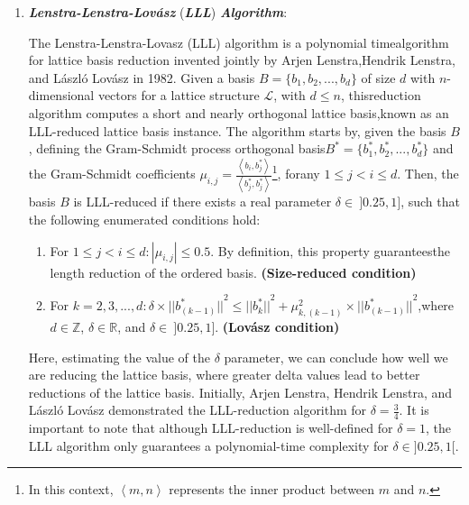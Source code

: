 \documentclass[runningheads]{llncs}
\numberwithin{equation}{section}
\begin{document}
    \begin{enumerate}
        \item \textbf{\textit{Lenstra-Lenstra-Lov\'{a}sz}} (\textbf{\textit{LLL}}) \textbf{\textit{Algorithm}}:
        \vspace{0.6ex}

        The Lenstra-Lenstra-Lovasz (LLL) algorithm \cite{lenstra-lenstra-lovasz:factoring-polynomials-with-rational-coefficients:1982:06-2024} is a polynomial time\break algorithm for lattice basis reduction invented jointly by Arjen Lenstra,\break Hendrik Lenstra, and L\'{a}szl\'{o} Lov\'{a}sz in 1982. Given a basis $B = \{ {b}_{1}, {b}_{2}, ..., {b}_{d} \}$ of size $d$ with $n$-dimensional vectors for a lattice structure $\mathcal{L}$, with $d \leq n$, this\break reduction algorithm computes a short and nearly orthogonal lattice basis,\break known as an LLL-reduced lattice basis instance. The algorithm starts by, given the basis $B$, defining the Gram-Schmidt process orthogonal basis\break ${B}^{*} = \{ {b}^{*}_{1}, {b}^{*}_{2}, ..., {b}^{*}_{d} \}$ and the Gram-Schmidt coefficients ${\mu}_{i,j} = \frac{ \left\langle {b}_{i},{b}^{*}_{j} \right\rangle }{ \left\langle {b}^{*}_{j},{b}^{*}_{j} \right\rangle }$\footnote{In this context, $\left\langle m, n \right\rangle$ represents the inner product between $m$ and $n$.}, for\break\newpage any $1 \leq j < i \leq d$. Then, the basis $B$ is LLL-reduced if there exists a real parameter $\delta \in\ ]0.25,1]$, such that the following enumerated conditions hold:
        \begin{enumerate}
            \item For $1 \leq j < i \leq d: |{\mu}_{i,j}| \leq 0.5$. By definition, this property guarantees\break the length reduction of the ordered basis. \textbf{(Size-reduced condition)}
            \item For $k = 2, 3, ..., d: \delta \times {||{b}^{*}_{(k - 1)}||}^{2} \leq {||{b}^{*}_{k}||}^{2} + {\mu}^{2}_{k,(k - 1)} \times {||{b}^{*}_{(k - 1)}||}^{2}$,\break where $d \in \mathbb{Z}$, $\delta \in \mathbb{R}$, and $\delta \in\ ]0.25,1]$. \textbf{(Lov\'{a}sz condition)}
        \end{enumerate}
        \vspace{2ex}
        
        Here, estimating the value of the $\delta$ parameter, we can conclude how well we are reducing the lattice basis, where greater delta values lead to better reductions of the lattice basis. Initially, Arjen Lenstra, Hendrik Lenstra, and L\'{a}szl\'{o} Lov\'{a}sz demonstrated the LLL-reduction algorithm for $\delta = \frac{3}{4}$. It is important to note that although LLL-reduction is well-defined for $\delta = 1$, the LLL algorithm only guarantees a polynomial-time complexity for $\delta \in ]0.25, 1[$.


\end{enumerate}
\end{document}
